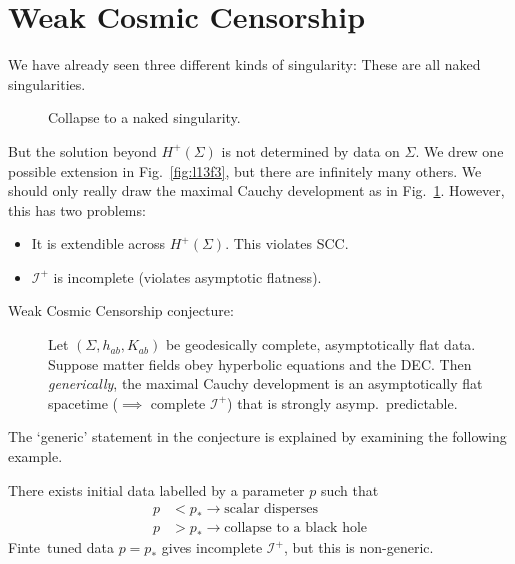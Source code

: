 \section{Weak Cosmic Censorship}%
\label{sec:weak_cosmic_censorship}

We have already seen three different kinds of singularity:
These are all naked singularities.

\begin{figure}[tbhp]
  \centering
  \begin{minipage}[t]{0.5\columnwidth}
    \centering
    \def\svgwidth{0.4\columnwidth}
    
    \caption{Collapse to a naked singularity.}
    \label{fig:l13f3}
  \end{minipage}%
  \begin{minipage}[t]{0.5\columnwidth}
    \centering
    \def\svgwidth{0.4\columnwidth}
    
    \caption{}
    \label{fig:l13f4}
  \end{minipage}
\end{figure}

But the solution beyond $H^+(\Sigma)$  is not determined by data on $\Sigma$. We drew one possible extension in Fig.~\ref{fig:l13f3}, but there are infinitely many others.
We should only really draw the maximal Cauchy development as in Fig.~\ref{fig:l13f4}.
However, this has two problems:
\begin{itemize}
  \item It is extendible across $H^+(\Sigma)$. This violates SCC.
  \item $\mathscr{I}^+$ is incomplete (violates asymptotic flatness).
\end{itemize}

\begin{description}
  \item[Weak Cosmic Censorship conjecture:] Let $(\Sigma, h_{ab}, K_{ab})$ be geodesically complete, asymptotically flat data. Suppose matter fields obey hyperbolic equations and the DEC. Then \emph{generically}, the maximal Cauchy development is an asymptotically flat spacetime ($\implies$ complete $\mathscr{I}^+$) that is strongly asymp.~predictable.
\end{description}

The `generic' statement in the conjecture is explained by examining the following example.
\begin{example}
  There exists initial data labelled by a parameter $p$ such that
  \begin{align}
    p &< p_* \longrightarrow \text{scalar disperses} \\
    p &> p_* \longrightarrow \text{collapse to a black hole}
  \end{align}
  Finte~tuned data $p = p_*$ gives incomplete $\mathscr{I}^+$, but this is non-generic.
\end{example}

